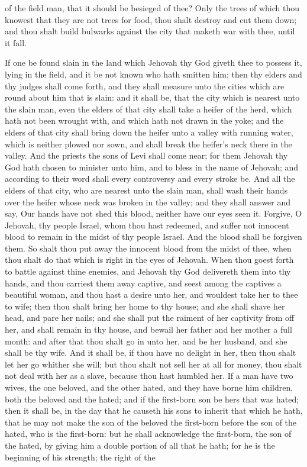 of the field man, that it should be besieged of thee? Only the trees of which thou knowest that they are not trees for food, thou shalt destroy and cut them down; and thou shalt build bulwarks against the city that maketh war with thee, until it fall. 

If one be found slain in the land which Jehovah thy God giveth thee to possess it, lying in the field, and it be not known who hath smitten him; then thy elders and thy judges shall come forth, and they shall measure unto the cities which are round about him that is slain: and it shall be, that the city which is nearest unto the slain man, even the elders of that city shall take a heifer of the herd, which hath not been wrought with, and which hath not drawn in the yoke; and the elders of that city shall bring down the heifer unto a valley with running water, which is neither plowed nor sown, and shall break the heifer’s neck there in the valley. And the priests the sons of Levi shall come near; for them Jehovah thy God hath chosen to minister unto him, and to bless in the name of Jehovah; and according to their word shall every controversy and every stroke be. And all the elders of that city, who are nearest unto the slain man, shall wash their hands over the heifer whose neck was broken in the valley; and they shall answer and say, Our hands have not shed this blood, neither have our eyes seen it. Forgive, O Jehovah, thy people Israel, whom thou hast redeemed, and suffer not innocent blood to remain in the midst of thy people Israel. And the blood shall be forgiven them. So shalt thou put away the innocent blood from the midst of thee, when thou shalt do that which is right in the eyes of Jehovah.  When thou goest forth to battle against thine enemies, and Jehovah thy God delivereth them into thy hands, and thou carriest them away captive, and seest among the captives a beautiful woman, and thou hast a desire unto her, and wouldest take her to thee to wife; then thou shalt bring her home to thy house; and she shall shave her head, and pare her nails; and she shall put the raiment of her captivity from off her, and shall remain in thy house, and bewail her father and her mother a full month: and after that thou shalt go in unto her, and be her husband, and she shall be thy wife. And it shall be, if thou have no delight in her, then thou shalt let her go whither she will; but thou shalt not sell her at all for money, thou shalt not deal with her as a slave, because thou hast humbled her.  If a man have two wives, the one beloved, and the other hated, and they have borne him children, both the beloved and the hated; and if the first-born son be hers that was hated; then it shall be, in the day that he causeth his sons to inherit that which he hath, that he may not make the son of the beloved the first-born before the son of the hated, who is the first-born: but he shall acknowledge the first-born, the son of the hated, by giving him a double portion of all that he hath; for he is the beginning of his strength; the right of the 